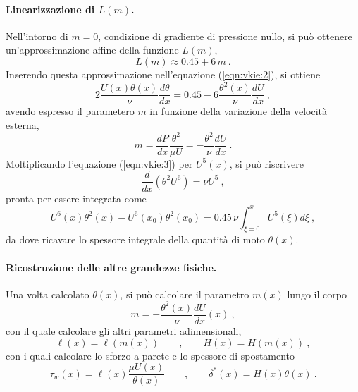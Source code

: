 \paragraph{Linearizzazione di $L(m)$.} Nell'intorno di $m=0$, condizione di gradiente di pressione nullo, si può ottenere un'approssimazione affine della funzione $L(m)$,
\begin{equation}
 L(m) \approx 0.45 + 6 \, m \ .
\end{equation}
Inserendo questa approssimazione nell'equazione (\ref{eqn:vkie:2}), si ottiene
\begin{equation}\label{eqn:vkie:3}
 2 \dfrac{U(x) \theta(x)}{\nu} \dfrac{d \theta}{dx} = 0.45 - 6 \dfrac{\theta^2(x)}{\nu} \dfrac{dU}{dx} \ ,
\end{equation}
avendo espresso il parametero $m$ in funzione della variazione della velocità esterna,
\begin{equation}
 m = \dfrac{dP}{dx} \dfrac{\theta^2}{\mu U} = - \dfrac{\theta^2}{\nu} \dfrac{dU}{dx} \ .
\end{equation}
Moltiplicando l'equazione (\ref{eqn:vkie:3}) per $U^5(x)$, si può riscrivere
\begin{equation}
 \dfrac{d}{dx} \left( \theta^2 U^6 \right) = \nu U^5 \ ,
\end{equation}
pronta per essere integrata come
\begin{equation}
 U^6(x) \theta^2(x) - U^6(x_0) \theta^2(x_0) = 0.45 \, \nu \int_{\xi=0}^{x} U^5(\xi) d \xi \ ,
\end{equation}
da dove ricavare lo spessore integrale della quantità di moto $\theta(x)$.

\paragraph{Ricostruzione delle altre grandezze fisiche.}
Una volta calcolato $\theta(x)$, si può calcolare il parametro $m(x)$ lungo il corpo
\begin{equation}
  m = - \dfrac{\theta^2(x)}{\nu}\dfrac{dU}{dx}(x) \ ,
\end{equation}
con il quale calcolare gli altri parametri adimensionali,
\begin{equation}
 \ell(x) = \ell(m(x)) \qquad , \qquad H(x) = H(m(x)) \ ,
\end{equation}
con i quali calcolare lo sforzo a parete e lo spessore di spostamento
\begin{equation}
 \tau_w(x) = \ell(x) \dfrac{\mu U(x)}{\theta(x)} \qquad , \qquad \delta^*(x) = H(x) \theta(x) \ .
\end{equation}




